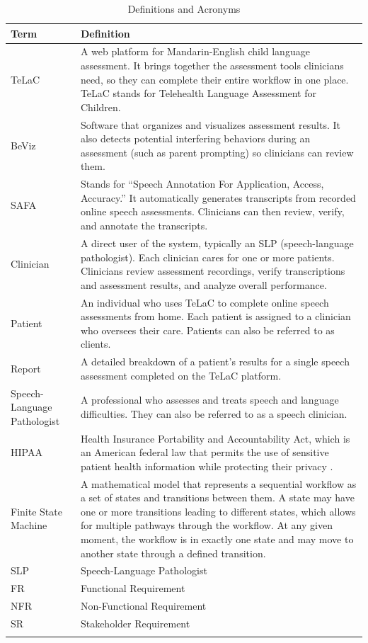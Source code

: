 \documentclass[12pt]{article}
\begin{document}
\begin{longtable}{p{} p{}}
\toprule
Term & Definition\\
\midrule
TeLaC & A web platform for Mandarin-English child language assessment. It brings together the assessment tools clinicians need, so they can complete their entire workflow in one place. TeLaC stands for Telehealth Language Assessment for Children.\\
\midrule
BeViz & Software that organizes and visualizes assessment results. It also detects potential interfering behaviors during an assessment (such as parent prompting) so clinicians can review them.\\
\midrule
SAFA & Stands for “Speech Annotation For Application, Access, Accuracy.” It automatically generates transcripts from recorded online speech assessments. Clinicians can then review, verify, and annotate the transcripts.\\
\midrule
Clinician & A direct user of the system, typically an SLP (speech-language pathologist). Each clinician cares for one or more patients. Clinicians review assessment recordings, verify transcriptions and assessment results, and analyze overall performance.\\
\midrule
Patient & An individual who uses TeLaC to complete online speech assessments from home. Each patient is assigned to a clinician who oversees their care. Patients can also be referred to as clients.\\
\midrule
Report & A detailed breakdown of a patient’s results for a single speech assessment completed on the TeLaC platform.\\
\midrule
Speech-Language Pathologist & A professional who assesses and treats speech and language difficulties. They can also be referred to as a speech clinician.\\
\midrule
HIPAA & Health Insurance Portability and Accountability Act, which is an American federal law that permits the use of sensitive patient health information while protecting their privacy \citep{CDC_HIPAA_1996}.\\
\midrule
Finite State Machine & A mathematical model that represents a sequential workflow as a set of states and transitions between them. A state may have one or more transitions leading to different states, which allows for multiple pathways through the workflow. At any given moment, the workflow is in exactly one state and may move to another state through a defined transition.\\
\midrule
SLP & Speech-Language Pathologist\\
\midrule
FR & Functional Requirement\\
\midrule
NFR & Non-Functional Requirement\\
\midrule
SR & Stakeholder Requirement\\
\bottomrule
\caption{Definitions and Acronyms} \label{tab:DefinitionsAndAcronyms}
\end{longtable}
\end{document}
